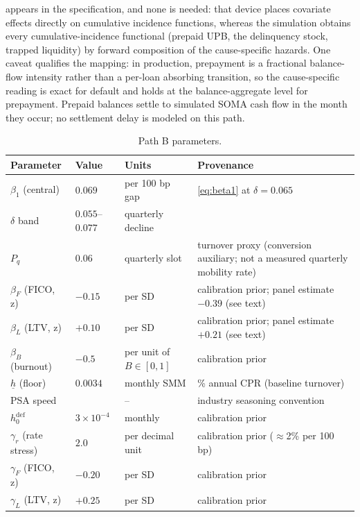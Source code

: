 \documentclass[12pt]{article}
\begin{document}
appears in the specification, and none is needed: that device places covariate effects directly on cumulative incidence functions, whereas the simulation obtains every cumulative-incidence functional (prepaid UPB, the delinquency stock, trapped liquidity) by forward composition of the cause-specific hazards. One caveat qualifies the mapping: in production, prepayment is a fractional balance-flow intensity rather than a per-loan absorbing transition, so the cause-specific reading is exact for default and holds at the balance-aggregate level for prepayment. Prepaid balances settle to simulated SOMA cash flow in the month they occur; no settlement delay is modeled on this path.

\begin{table}[H]
\centering
\footnotesize
\setlength{\tabcolsep}{4pt}
\begin{threeparttable}
\caption{Path B parameters.}
\label{tab:params}
\begin{tabular}{@{}>{\raggedright\arraybackslash}p{2.8cm}>{\raggedright\arraybackslash}p{1.8cm}>{\raggedright\arraybackslash}p{2.6cm}>{\raggedright\arraybackslash}p{6.3cm}@{}}
\toprule
Parameter & Value & Units & Provenance \\
\midrule
$\beta_1$ (central) & $0.069$ & per 100 bp gap & \eqref{eq:beta1} at $\delta = 0.065$ \citep{liebersohn2024} \\
$\delta$ band & $0.055$--$0.077$ & quarterly decline & \citet{liebersohn2024} \\
$P_q$ & $0.06$ & quarterly slot & turnover proxy (conversion auxiliary; not a measured quarterly mobility rate) \\
$\beta_F$ (FICO, z) & $-0.15$ & per SD & calibration prior; panel estimate $-0.39$ (see text) \\
$\beta_L$ (LTV, z) & $+0.10$ & per SD & calibration prior; panel estimate $+0.21$ (see text) \\
$\beta_B$ (burnout) & $-0.5$ & per unit of $B \in [0,1]$ & calibration prior \\
$\underline{h}$ (floor) & $0.0034$ & monthly SMM & 4\% annual CPR (baseline turnover) \\
PSA speed & 100 & -- & industry seasoning convention \\
$h^{\mathrm{def}}_0$ & $3\times10^{-4}$ & monthly & calibration prior \\
$\gamma_r$ (rate stress) & $2.0$ & per decimal unit & calibration prior ($\approx$2\% per 100 bp) \\
$\gamma_F$ (FICO, z) & $-0.20$ & per SD & calibration prior \\
$\gamma_L$ (LTV, z) & $+0.25$ & per SD & calibration prior \\
\bottomrule
\end{tabular}
\end{threeparttable}
\end{table}
\end{document}

